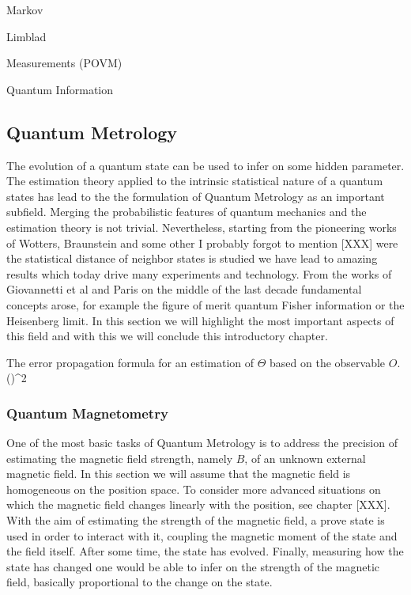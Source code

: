 Markov

Limblad

Measurements (POVM)

Quantum Information

\subsection{Quantum Metrology}

The evolution of a quantum state can be used to infer on some hidden parameter.
The estimation theory applied to the intrinsic statistical nature of a quantum states has lead to the the formulation of Quantum Metrology as an important subfield.
Merging the probabilistic features of quantum mechanics and the estimation theory is not trivial.
Nevertheless, starting from the pioneering works of Wotters, Braunstein and some other I probably forgot to mention [XXX] were the statistical distance of neighbor states is studied we have lead to amazing results which today drive many experiments and technology.
From the works of Giovannetti et al and Paris on the middle of the last decade fundamental concepts arose, for example the figure of merit quantum Fisher information or the Heisenberg limit.
In this section we will highlight the most important aspects of this field and with this we will conclude this introductory chapter.

The error propagation formula for an estimation of $\Theta$ based on the observable $O$.
\be
  (\Delta \Theta)^2 \geq {}
\ee

\subsubsection{Quantum Magnetometry}
\label{sec:bg-quantum-metro}

One of the most basic tasks of Quantum Metrology is to address the precision of estimating the magnetic field strength, namely $B$, of an unknown external magnetic field.
In this section we will assume that the magnetic field is homogeneous on the position space.
To consider more advanced situations on which the magnetic field changes linearly with the position, see chapter [XXX].
With the aim of estimating the strength of the magnetic field, a prove state is used in order to interact with it, coupling the magnetic moment of the state and the field itself.
After some time, the state has evolved.
Finally, measuring how the state has changed one would be able to infer on the strength of the magnetic field, basically proportional to the change on the state.


